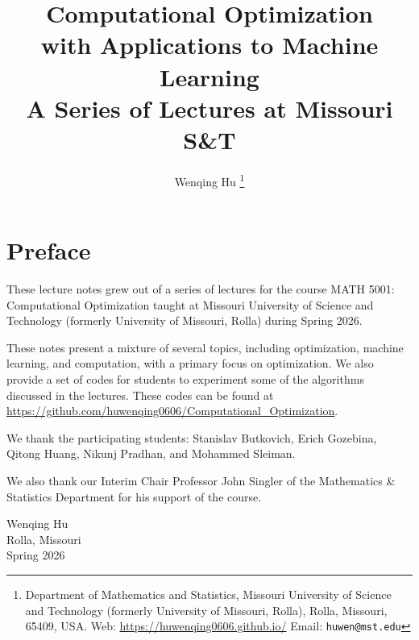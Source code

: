 \documentclass[11pt]{book}
\begin{document}
\title{\huge{\textbf{Computational Optimization}}\\
\Large{with Applications to Machine Learning}\\[1em]
\small{A Series of Lectures at Missouri S\&T}}

\author{Wenqing Hu
\thanks{Department of Mathematics and Statistics, Missouri University of Science and Technology
(formerly University of Missouri, Rolla), Rolla, Missouri, 65409, USA. Web: \url{https://huwenqing0606.github.io/} Email: \texttt{huwen@mst.edu}}}

\date{}

\maketitle

\chapter*{Preface}

These lecture notes grew out of a series of lectures for the course
MATH 5001: Computational Optimization taught at Missouri University
of Science and Technology (formerly University of Missouri, Rolla)
during Spring 2026.

These notes present a mixture of several topics, including optimization,
machine learning, and computation, with a primary focus on optimization. We also provide a set of codes for students to experiment some of the algorithms discussed in the lectures. These codes can be found at \url{https://github.com/huwenqing0606/Computational_Optimization}.

We thank the participating students: Stanislav Butkovich, 
Erich Gozebina, Qitong Huang, Nikunj Pradhan, and Mohammed Sleiman.

We also thank our Interim Chair Professor John Singler of the Mathematics \& Statistics Department for his support of the course.

\vspace{1em}

\begin{flushright}
Wenqing Hu\\
Rolla, Missouri\\
Spring 2026
\end{flushright}

\tableofcontents















\newpage



\end{document}
